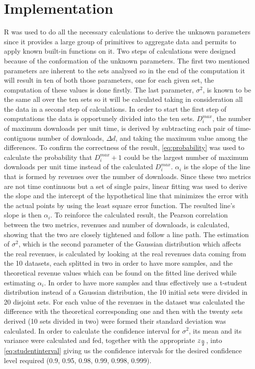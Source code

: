 \documentclass[conference]{IEEEtran}
\begin{document}
\section{Implementation}\label{sec:implementation}

R was used to do all the necessary calculations to derive the unknown parameters since it provides a large group of primitives to aggregate data and permits to apply known built-in functions on it. Two steps of calculations were designed because of the conformation of the unknown parameters. The first two mentioned parameters are inherent to the sets analysed so in the end of the computation it will result in ten of both those parameters, one for each given set, the computation of these values is done firstly. The last parameter, \(\sigma^2\), is known to be the same all over the ten sets so it will be calculated taking in consideration all the data in a second step of calculations. In order to start the first step of computations the data is opportunely divided into the ten sets.
\(D_i^{max}\), the number of maximum downloads per unit time, is derived by subtracting each pair of time-contiguous number of downloads, \(\Delta d\), and taking the maximum value among the differences. To confirm the correctness of the result, \cref{eq:probability} was used to calculate the probability that \(D_i^{max} +1\) could be the largest number of maximum downloads per unit time instead of the calculated \(D_i^{max}\).
\(\alpha_i\) is the slope of the line that is formed by revenues over the number of downloads. Since these two metrics are not time continuous but a set of single pairs, linear fitting was used to derive the slope and the intercept of the hypothetical line that minimizes the error with the actual points by using the least square error function. The resulted line’s slope is then \(\alpha_i\). To reinforce the calculated result, the Pearson correlation between the two metrics, revenues and number of downloads, is calculated, showing that the two are closely tightened and follow a line path.
The estimation of \(\sigma^2\), which is the second parameter of the Gaussian distribution which affects the real revenues, is calculated by looking at the real revenues data coming from the 10 datasets, each splitted in two in order to have more samples, and the theoretical revenue values which can be found on the fitted line derived while estimating \(\alpha_i\). In order to have more samples and thus effectively use a t-student distribution instead of a Gaussian distribution, the 10 initial sets were divided in 20 disjoint sets. For each value of the revenues in the dataset was calculated the difference with the theoretical corresponding one and then with the twenty sets derived (10 sets divided in two) were formed their standard deviation was calculated. In order to calculate the confidence interval for \(\sigma^2\), its mean and its variance were calculated and fed, together with the appropriate \(z_{\alpha \over 2}\), into \cref{eq:studentinterval} giving us the confidence intervals for the desired confidence level required (0.9, 0.95, 0.98, 0.99, 0.998, 0.999).
\end{document}
